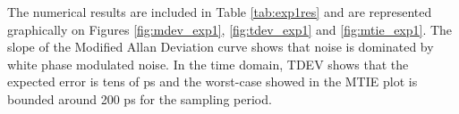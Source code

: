 The numerical results are included in Table \ref{tab:exp1res} and are 
represented graphically on Figures \ref{fig:mdev_exp1}, 
\ref{fig:tdev_exp1} and \ref{fig:mtie_exp1}. The slope of the Modified Allan 
Deviation curve shows that noise is dominated by white phase modulated noise. 
In the time domain, TDEV shows that the expected error is tens of ps and the 
worst-case showed in the MTIE plot is bounded around 200 ps for the sampling 
period. 


